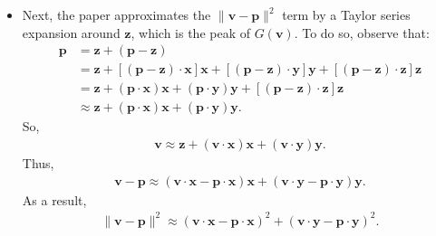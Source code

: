 \documentclass[10pt]{article}
\newcommand{\ve}[1]{\mathbf{#1}}
\begin{document}
\begin{itemize}
    \item Next, the paper approximates the $\| \ve{v} - \ve{p} \|^2$ term by a Taylor series expansion around $\ve{z}$, which is the peak of $G(\ve{v})$.  To do so, observe that:
    \begin{align*}
      \ve{p} 
      &= \ve{z} + (\ve{p} - \ve{z}) \\
      &= \ve{z} + [(\ve{p} - \ve{z})\cdot \ve{x}] \ve{x} + [(\ve{p} - \ve{z})\cdot \ve{y}] \ve{y} + [(\ve{p} - \ve{z})\cdot \ve{z}] \ve{z} \\
      &= \ve{z} + (\ve{p} \cdot \ve{x}) \ve{x} + (\ve{p} \cdot \ve{y}) \ve{y} + [(\ve{p} - \ve{z})\cdot \ve{z}] \ve{z} \\
      &\approx \ve{z} + (\ve{p} \cdot \ve{x}) \ve{x} + (\ve{p} \cdot \ve{y}) \ve{y}.
    \end{align*}
    So,
    \begin{align*}
      \ve{v} \approx \ve{z} + (\ve{v} \cdot \ve{x}) \ve{x} + (\ve{v} \cdot \ve{y}) \ve{y}.
    \end{align*}
    Thus,
    \begin{align*}
      \ve{v} - \ve{p} \approx (\ve{v} \cdot \ve{x} - \ve{p} \cdot \ve{x}) \ve{x} + (\ve{v} \cdot \ve{y} - \ve{p} \cdot \ve{y}) \ve{y}.
    \end{align*}
    As a result,
    \begin{align*}
      \| \ve{v} - \ve{p} \|^2 \approx (\ve{v} \cdot \ve{x} - \ve{p} \cdot \ve{x})^2 + (\ve{v} \cdot \ve{y} - \ve{p} \cdot \ve{y})^2.      
    \end{align*}


\end{itemize}
\end{document}
